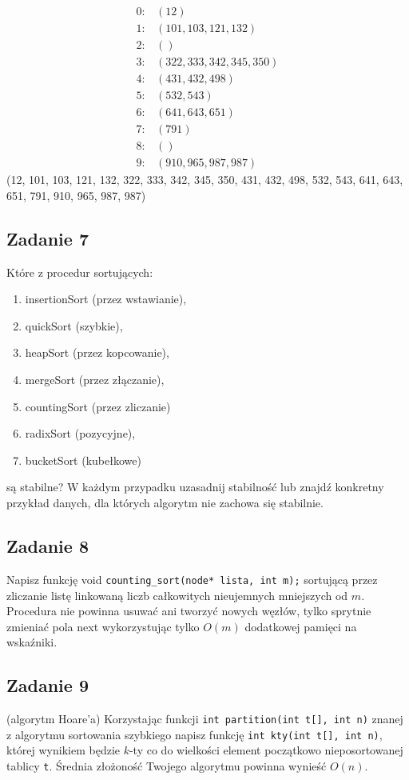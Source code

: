 \documentclass{article}
\begin{document}
\begin{align*}
    0: & \left(12\right) \\
    1: & \left(101, 103, 121, 132\right) \\
    2: & \left(\right) \\
    3: & \left(322, 333, 342, 345, 350\right) \\
    4: & \left(431, 432, 498\right) \\
    5: & \left(532, 543\right) \\
    6: & \left(641, 643, 651\right) \\
    7: & \left(791\right) \\
    8: & \left(\right) \\
    9: & \left(910, 965, 987, 987\right)
\end{align*}
(12, 101, 103, 121, 132, 322, 333, 342, 345, 350, 431, 432, 498, 532, 543, 641, 643, 651, 791, 910, 965, 987, 987)

\subsection*{Zadanie 7}
Które z procedur sortujących:
\begin{enumerate}[label=(\alph*)]
    \item insertionSort (przez wstawianie),
    \item quickSort (szybkie),
    \item heapSort (przez kopcowanie),
    \item mergeSort (przez złączanie),
    \item countingSort (przez zliczanie)
    \item radixSort (pozycyjne),
    \item bucketSort (kubełkowe)
\end{enumerate}
są stabilne? W każdym przypadku uzasadnij stabilność lub znajdź konkretny przykład
danych, dla których algorytm nie zachowa się stabilnie.

\subsection*{Zadanie 8}
Napisz funkcję void \verb+counting_sort(node* lista, int m);+ sortującą przez zliczanie
listę linkowaną liczb całkowitych nieujemnych mniejszych od $m$. Procedura nie powinna
usuwać ani tworzyć nowych węzłów, tylko sprytnie zmieniać pola next wykorzystując
tylko $O(m)$ dodatkowej pamięci na wskaźniki.

\subsection*{Zadanie 9}
(algorytm Hoare'a) Korzystając funkcji \verb+int partition(int t[], int n)+ znanej z
algorytmu sortowania szybkiego napisz funkcję \verb+int kty(int t[], int n)+, której wynikiem
będzie $k$-ty co do wielkości element początkowo nieposortowanej tablicy \verb+t+. Średnia
złożoność Twojego algorytmu powinna wynieść $O(n)$.
\end{document}

